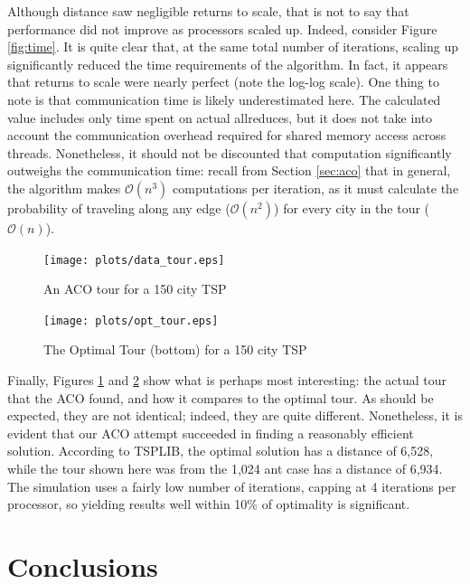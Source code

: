 \documentclass[twocolumn]{article}
\begin{document}
Although distance saw negligible returns to scale, that is not to say that 
performance did not improve as processors scaled up. Indeed, consider Figure
\ref{fig:time}. It is quite clear that, at the same total number of iterations,
scaling up significantly reduced the time requirements of the algorithm. In fact,
it appears that returns to scale were nearly perfect (note the log-log scale). 
One thing to note is that communication time is likely underestimated here. The
calculated value
includes only time spent on actual allreduces, but it does not take into account
the communication overhead required for shared memory access across threads. 
Nonetheless, it should not be discounted that computation significantly outweighs
the communication time: recall from Section \ref{sec:aco} that in general, the 
algorithm makes $\mathcal{O}(n^3)$ 
computations per iteration, as it must calculate the probability of traveling 
along any edge ($\mathcal{O}(n^2)$) for every city in the tour ($\mathcal{O}(n)$). \\

\begin{figure}[t]
  \centering
  \texttt{[image: plots/data\_tour.eps]}
  \caption{An ACO tour for a 150 city TSP} \label{fig:ourtour}
\end{figure}

\begin{figure}[!ht]
  \centering
  \texttt{[image: plots/opt\_tour.eps]}
  \caption{The Optimal Tour (bottom) for a 150 city TSP} 
  \label{fig:opttour}
\end{figure}

Finally, Figures \ref{fig:ourtour} and \ref{fig:opttour} show what is perhaps 
most interesting: the actual tour that the ACO found, and how it compares to 
the optimal tour. As should be expected, they are not identical; indeed, 
they are quite different. Nonetheless, it is evident that our ACO attempt succeeded
in finding a reasonably efficient solution. According to TSPLIB, the optimal solution
has a distance of 6,528, while the tour shown here was from the 1,024 ant case
has a distance of 6,934. The simulation uses a fairly low number of iterations, 
capping at 4 iterations per processor, so yielding results well within 10\% of
optimality is significant. 

\section{Conclusions}
\end{document}
